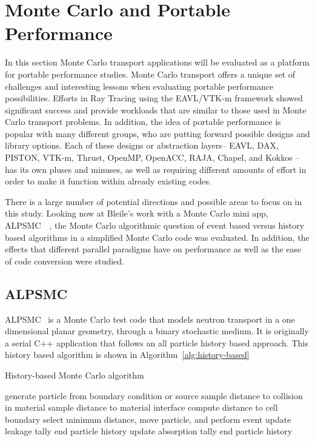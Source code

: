 \section{\textbf{Monte Carlo and Portable Performance}}

In this section Monte Carlo transport applications will be evaluated as a platform for portable performance studies.
%
Monte Carlo transport offers a unique set of challenges and interesting lessons when evaluating portable performance possibilities.
%
Efforts in Ray Tracing using the EAVL/VTK-m framework showed significant success and provide workloads that are similar to those used in Monte Carlo transport problems.
%
In addition, the idea of portable performance is popular with many different groups, who are putting forward possible designs and library options.
%
Each of these designs or abstraction layers-- EAVL, DAX, PISTON, VTK-m, Thrust, OpenMP, OpenACC, RAJA, Chapel, and Kokkos --has its own pluses and minuses, as well as requiring different amounts of effort in order to make it function within already existing codes.
%

%
There is a large number of potential directions and possible areas to focus on in this study.
%
Looking now at Bleile's work with a Monte Carlo mini app, ALPSMC~\cite{alpsmc1}~\cite{alpsmc2}, the Monte Carlo algorithmic question of event based versus history based algorithms in a simplified Monte Carlo code was evaluated.
%
In addition, the effects that different parallel paradigms have on performance as well as the ease of code conversion were studied.
%

\subsection{\textbf{ALPSMC}}

ALPSMC~\cite{brantley2011benchmark} is a Monte Carlo test code that models neutron transport in a one dimensional planar geometry, through a binary stochastic medium.
%
It is originally a serial C++ application that follows an all particle history based approach.
%
This history based algorithm is shown in Algorithm~\ref{alg:history-based}
%

\begin{algorithm}
\DontPrintSemicolon
\caption{History-based Monte Carlo algorithm}
\label{alg:history-based}
{ 
    generate particle from boundary condition or source\;
    {
       sample distance to collision in material\;
       sample distance to material interface\;
       compute distance to cell boundary\;
       select minimum distance, move particle, and perform event\;
       {
          update leakage tally\;
          end particle history\;
       }
       {
          update absorption tally\;
          end particle history\;
       }
    }
}
\end{algorithm}
%

